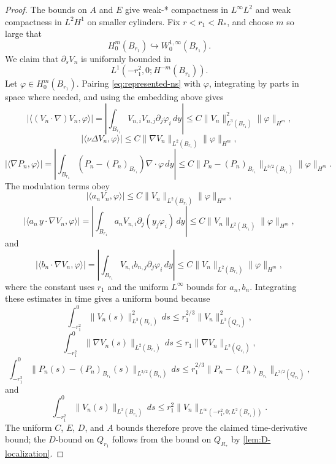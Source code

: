 \documentclass[11pt]{amsart}
\theoremstyle{plain}
\theoremstyle{definition}
\theoremstyle{remark}
\begin{document}
\begin{proof}
The bounds on \(A\) and \(E\) give weak-* compactness in \(L^\infty L^2\) and
weak compactness in \(L^2H^1\) on smaller cylinders.  Fix
\(r<r_1<R_*\), and choose \(m\) so large that
\[
  H^m_0(B_{r_1})\hookrightarrow W^{1,\infty}_0(B_{r_1}).
\]
We claim that \(\partial_sV_n\) is uniformly bounded in
\[
  L^1(-r_1^2,0;H^{-m}(B_{r_1})).
\]
Let \(\varphi\in H^m_0(B_{r_1})\).  Pairing \eqref{eq:represented-ns} with
\(\varphi\), integrating by parts in space where needed, and using the
embedding above gives
\[
  |\langle (V_n\cdot\nabla)V_n,\varphi\rangle|
  =
  \left|\int_{B_{r_1}}V_{n,i}V_{n,j}\partial_j\varphi_i\,dy\right|
  \le
  C\|V_n\|_{L^3(B_{r_1})}^2\|\varphi\|_{H^m},
\]
\[
  |\langle \nu\Delta V_n,\varphi\rangle|
  \le
  C\|\nabla V_n\|_{L^2(B_{r_1})}\|\varphi\|_{H^m},
\]
\[
  |\langle \nabla P_n,\varphi\rangle|
  =
  \left|\int_{B_{r_1}}(P_n-(P_n)_{B_{r_1}})\nabla\cdot\varphi\,dy\right|
  \le
  C\|P_n-(P_n)_{B_{r_1}}\|_{L^{3/2}(B_{r_1})}\|\varphi\|_{H^m}.
\]
The modulation terms obey
\[
  |\langle a_nV_n,\varphi\rangle|
  \le
  C\|V_n\|_{L^2(B_{r_1})}\|\varphi\|_{H^m},
\]
\[
  |\langle a_n\,y\cdot\nabla V_n,\varphi\rangle|
  =
  \left|\int_{B_{r_1}}a_n V_{n,i}\partial_j(y_j\varphi_i)\,dy\right|
  \le
  C\|V_n\|_{L^2(B_{r_1})}\|\varphi\|_{H^m},
\]
and
\[
  |\langle b_n\cdot\nabla V_n,\varphi\rangle|
  =
  \left|\int_{B_{r_1}}V_{n,i}b_{n,j}\partial_j\varphi_i\,dy\right|
  \le
  C\|V_n\|_{L^2(B_{r_1})}\|\varphi\|_{H^m},
\]
where the constant uses \(r_1\) and the uniform \(L^\infty\) bounds for
\(a_n,b_n\).  Integrating these estimates in time gives a uniform bound because
\[
  \int_{-r_1^2}^0\|V_n(s)\|_{L^3(B_{r_1})}^2\,ds
  \le
  r_1^{2/3}\|V_n\|_{L^3(Q_{r_1})}^2,
\]
\[
  \int_{-r_1^2}^0\|\nabla V_n(s)\|_{L^2(B_{r_1})}\,ds
  \le
  r_1\|\nabla V_n\|_{L^2(Q_{r_1})},
\]
\[
  \int_{-r_1^2}^0
  \|P_n(s)-(P_n)_{B_{r_1}}(s)\|_{L^{3/2}(B_{r_1})}\,ds
  \le
  r_1^{2/3}
  \|P_n-(P_n)_{B_{r_1}}\|_{L^{3/2}(Q_{r_1})},
\]
and
\[
  \int_{-r_1^2}^0\|V_n(s)\|_{L^2(B_{r_1})}\,ds
  \le
  r_1^2
  \|V_n\|_{L^\infty(-r_1^2,0;L^2(B_{r_1}))}.
\]
The uniform \(C\), \(E\), \(D\), and \(A\) bounds therefore prove the claimed
time-derivative bound; the \(D\)-bound on \(Q_{r_1}\) follows from the bound on
\(Q_{R_*}\) by \cref{lem:D-localization}.


\end{proof}
\end{document}
